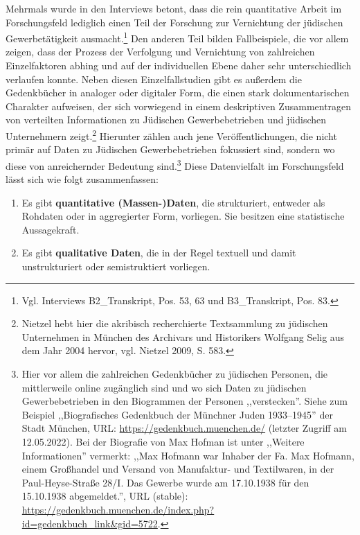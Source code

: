 Mehrmals wurde in den Interviews betont, dass die rein quantitative Arbeit im Forschungsfeld lediglich einen Teil der Forschung zur Vernichtung der jüdischen Gewerbetätigkeit ausmacht.\footnote{Vgl. Interviews B2\_Transkript, Pos. 53, 63 und B3\_Transkript, Pos. 83.} Den anderen Teil bilden Fallbeispiele, die vor allem zeigen, dass der Prozess der Verfolgung und Vernichtung von zahlreichen Einzelfaktoren abhing und auf der individuellen Ebene daher sehr unterschiedlich verlaufen konnte. Neben diesen Einzelfallstudien gibt es außerdem die Gedenkbücher in analoger oder digitaler Form, die einen stark dokumentarischen Charakter aufweisen, der sich vorwiegend in einem deskriptiven Zusammentragen von verteilten Informationen zu Jüdischen Gewerbebetrieben und jüdischen Unternehmern zeigt.\footnote{Nietzel hebt hier die akribisch recherchierte Textsammlung zu jüdischen Unternehmen in München des Archivars und Historikers Wolfgang Selig aus dem Jahr 2004 hervor, vgl. Nietzel 2009, S. 583.} Hierunter zählen auch jene Veröffentlichungen, die nicht primär auf Daten zu Jüdischen Gewerbebetrieben fokussiert sind, sondern wo diese von anreichernder Bedeutung sind.\footnote{Hier vor allem die zahlreichen Gedenkbücher zu jüdischen Personen, die mittlerweile online zugänglich sind und wo sich Daten zu jüdischen Gewerbebetrieben in den Biogrammen der Personen ,,verstecken''. Siehe zum Beispiel ,,Biografisches Gedenkbuch der Münchner Juden 1933–1945'' der Stadt München, URL: \url{https://gedenkbuch.muenchen.de/} (letzter Zugriff am 12.05.2022). Bei der Biografie von Max Hofman ist unter ,,Weitere Informationen'' vermerkt: ,,Max Hofmann war Inhaber der Fa. Max Hofmann, einem Großhandel und Versand von Manufaktur- und Textilwaren, in der Paul-Heyse-Straße 28/I. Das Gewerbe wurde am 17.10.1938 für den 15.10.1938 abgemeldet.'', URL (stable): \url{https://gedenkbuch.muenchen.de/index.php?id=gedenkbuch_link&gid=5722}.} Diese Datenvielfalt im Forschungsfeld lässt sich wie folgt zusammenfassen: 

\begin{enumerate}
    \item Es gibt \textbf{quantitative (Massen-)Daten}, die strukturiert, entweder als Rohdaten oder in aggregierter Form, vorliegen. Sie besitzen eine statistische Aussagekraft.
    \item Es gibt \textbf{qualitative Daten}, die in der Regel textuell und damit unstrukturiert oder semistruktiert vorliegen.
\end{enumerate}


